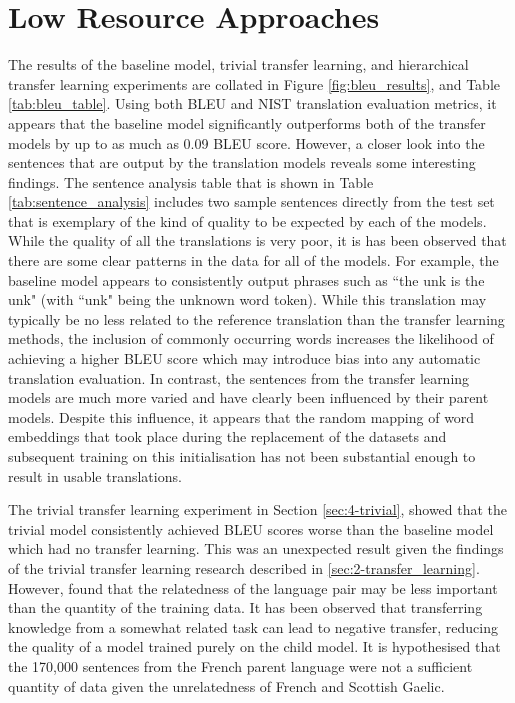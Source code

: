 \section{Low Resource Approaches}

The results of the baseline model, trivial transfer learning, and hierarchical transfer learning experiments are collated in Figure \ref{fig:bleu_results}, and Table \ref{tab:bleu_table}. Using both \acrshort{BLEU} and \acrshort{NIST} translation evaluation metrics, it appears that the baseline model significantly outperforms both of the transfer models by up to as much as 0.09 \acrshort{BLEU} score. However, a closer look into the sentences that are output by the translation models reveals some interesting findings. The sentence analysis table that is shown in Table \ref{tab:sentence_analysis} includes two sample sentences directly from the test set that is exemplary of the kind of quality to be expected by each of the models. While the quality of all the translations is very poor, it is has been observed that there are some clear patterns in the data for all of the models. For example, the baseline model appears to consistently output phrases such as ``the unk is the unk" (with ``unk" being the unknown word token). While this translation may typically be no less related to the reference translation than the transfer learning methods, the inclusion of commonly occurring words increases the likelihood of achieving a higher \acrshort{BLEU} score which may introduce bias into any automatic translation evaluation. In contrast, the sentences from the transfer learning models are much more varied and have clearly been influenced by their parent models. Despite this influence, it appears that the random mapping of word embeddings that took place during the replacement of the datasets and subsequent training on this initialisation has not been substantial enough to result in usable translations. 


The trivial transfer learning experiment in Section \ref{sec:4-trivial}, showed that the trivial model consistently achieved \acrshort{BLEU} scores worse than the baseline model which had no transfer learning. This was an unexpected result given the findings of the trivial transfer learning research described in \ref{sec:2-transfer_learning}.  
However, \cite{wang_negative_transfer_2019} found that the relatedness of the language pair may be less important than the quantity of the training data. It has been observed that transferring knowledge from a somewhat related task can lead to negative transfer, reducing the quality of a model trained purely on the child model. It is hypothesised that the 170,000 sentences from the French parent language were not a sufficient quantity of data given the unrelatedness of French and Scottish Gaelic.


